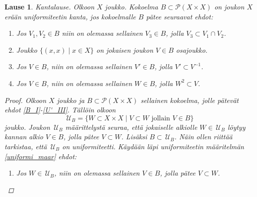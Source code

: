 \documentclass[12pt,a4paper,leqno]{report}
\newcommand{\U}{\,\mathcal{U}}
\newcommand{\Pot}{\mathcal{P}}
\theoremstyle{plain}
\newtheorem{lause}[equation]{Lause}
\theoremstyle{definition}
\theoremstyle{remark}
\begin{document}
\begin{lause}\label{uniformin kannan maar}
Kantalause. 
Olkoon $X$ joukko. 
Kokoelma $B\subset \Pot (X\times X)$ on joukon $X$ erään uniformiteetin kanta, 
jos kokoelmalle $B$ pätee seuraavat ehdot:
\begin{enumerate} [label=(B\arabic*)]
\item\label{B_I} Jos $V_1,V_2\in B$ niin on olemassa sellainen $V_3\in B$, jolla $V_3\subset V_1\cap V_2$.
\item\label{U'_I} Joukko $\{(x,x)\mid x\in X\}$ on jokaisen joukon $V\in B$ osajoukko.
\item\label{U'_II} Jos $V\in B$, niin on olemassa sellainen $V'\in B$, jolla $V'\subset V^{-1}%
$.
\item\label{U'_III} Jos $V\in B$, niin on olemassa sellainen $W\in B$, jolla $ W^2\subset V$.%
\end{enumerate}
\begin{proof}
Olkoon $X$ joukko ja $B\subset \Pot (X\times X)$ sellainen kokoelma, 
jolle pätevät ehdot \ref{B_I}-\ref{U'_III}. %
Tällöin olkoon 
$$\U_B=\{W\subset X\times X\mid V\subset W\text{ jollain } V\in B\}$$ 
joukko. 
Joukon $\U_B$ määrittelystä seuraa, 
että jokaiselle alkiolle $W\in\U_B$ löytyy 
kannan alkio $V\in B$, jolla pätee $V\subset W$. 
Lisäksi $ B\subset\U_B$.
Näin ollen riittää tarkistaa, että $\U_B$ on uniformiteetti. 
Käydään läpi uniformiteetin määritelmän \ref{uniformi_maar} ehdot:
\begin{enumerate} 
\item[\ref{F_I}] 
Jos $W\in \U_B$, niin on olemassa sellainen $V\in B$, jolla pätee $V\subset W$. 

\end{enumerate}
\end{proof}
\end{lause}
\end{document}
